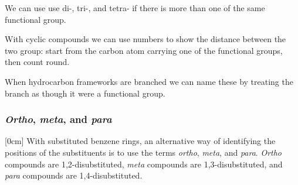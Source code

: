 We can use use di-, tri-, and tetra- if there is more than one of the same functional group.

With cyclic compounds we can use numbers to show the distance between the two group: start from the carbon atom carrying one of the functional groups, then count round.

When hydrocarbon frameworks are branched we can name these by treating the branch as though it were a functional group.

\subsubsection*{\emph{Ortho}, \emph{meta}, and \emph{para}}

[0cm] 
With substituted benzene rings, an alternative way of identifying the positions of the substituents is to use the terms \emph{ortho}, \emph{meta}, and \emph{para}. \emph{Ortho} compounds are 1,2-disubstituted, \emph{meta} compounds are 1,3-disubstituted, and \emph{para} compounds are 1,4-disubstituted.




